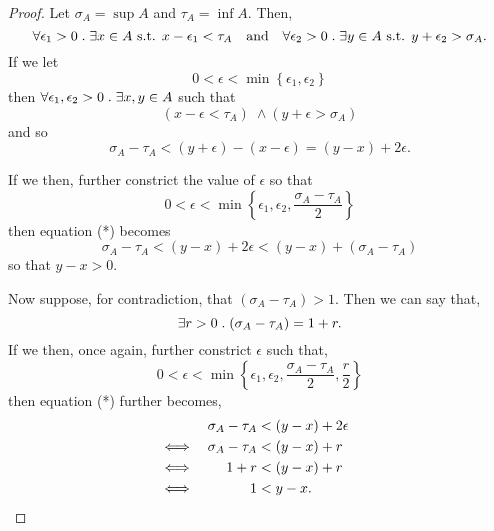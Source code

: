 \documentclass[../MathsNotesBase.tex]{subfiles}
\begin{document}
{		
		
		
		
		\biggerskip		
		\begin{proof}\nl[8]
			Let ${ \sigma_A = \sup A }$ and ${ \tau_A = \inf A }$. Then,
			\[ 
			\forall \epsilon_1 > 0 \;.\; \exists x \in A \text{ s.t. } x - \epsilon_1 < \tau_A \hspace{10pt}\text{and}\hspace{10pt} 
			\forall \epsilon_2 > 0 \;.\; \exists y \in A \text{ s.t. } y + \epsilon_2 > \sigma_A. 
			\]
			If we let
			\[ 0 < \epsilon < \min \left\{ \epsilon_1, \epsilon_2 \right\} \]
			then ${ \forall \epsilon_1,\epsilon_2 > 0 \;.\; \exists x,y \in A }$ such that
			\[  (x - \epsilon < \tau_A) \; \land (y + \epsilon > \sigma_A) \]
			and so
			\begin{equation}
				\sigma_A - \tau_A < (y + \epsilon) - (x - \epsilon) = (y - x) + 2\epsilon. \tag{*}
			\end{equation}
			
			\nl[8]
			If we then, further constrict the value of $\epsilon$ so that
			\[ 0 < \epsilon < \min \left\{ \epsilon_1, \epsilon_2, \frac{\sigma_A - \tau_A}{2} \right\} \]
			then equation (*) becomes			
			\[ \sigma_A - \tau_A < (y - x) + 2\epsilon < (y - x) + (\sigma_A - \tau_A) \]
			so that ${ y - x > 0 }$.
			
			\nl[8]
			Now suppose, for contradiction, that ${ (\sigma_A - \tau_A) > 1 }$. Then we can say that,
			\[ \exists r > 0 \;.\; (\sigma_A - \tau_A) = 1 + r. \] 
			If we then, once again, further constrict $\epsilon$ such that,
			\[ 0 < \epsilon < \min \left\{ \epsilon_1, \epsilon_2, \frac{\sigma_A - \tau_A}{2}, \frac{r}{2} \right\} \]
			then equation (*) further becomes,
			\[\begin{aligned}
				&& \sigma_A - \tau_A &< (y - x) + 2\epsilon \\
				&\iff & \sigma_A - \tau_A &< (y - x) + r &\text{\scriptsize{}} \\
				&\iff & 1 + r &< (y - x) + r &\text{\scriptsize{}} \\
				&\iff & 1 &< y - x. 
			\end{aligned}\]
			

\end{proof}}
\end{document}

